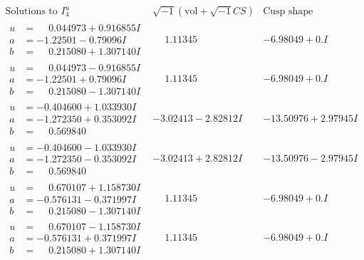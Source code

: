 \documentclass[1p]{elsarticle_modified}
\theoremstyle{definition}
\newcommand{\I}{\sqrt{-1}}
\begin{document}
$$\begin{array}{c|c|c}  
\text{Solutions to }I^u_{4}& \I (\text{vol} + \sqrt{-1}CS) & \text{Cusp shape}\\
 \hline 
\begin{aligned}
u &= \phantom{-}0.044973 + 0.916855 I \\
a &= -1.22501 - 0.79096 I \\
b &= \phantom{-}0.215080 + 1.307140 I\end{aligned}
 & \phantom{-}1.11345\phantom{ +0.000000I} & -6.98049 + 0. I\phantom{ +0.000000I} \\ \hline\begin{aligned}
u &= \phantom{-}0.044973 - 0.916855 I \\
a &= -1.22501 + 0.79096 I \\
b &= \phantom{-}0.215080 - 1.307140 I\end{aligned}
 & \phantom{-}1.11345\phantom{ +0.000000I} & -6.98049 + 0. I\phantom{ +0.000000I} \\ \hline\begin{aligned}
u &= -0.404600 + 1.033930 I \\
a &= -1.272350 + 0.353092 I \\
b &= \phantom{-}0.569840\phantom{ +0.000000I}\end{aligned}
 & -3.02413 - 2.82812 I & -13.50976 + 2.97945 I \\ \hline\begin{aligned}
u &= -0.404600 - 1.033930 I \\
a &= -1.272350 - 0.353092 I \\
b &= \phantom{-}0.569840\phantom{ +0.000000I}\end{aligned}
 & -3.02413 + 2.82812 I & -13.50976 - 2.97945 I \\ \hline\begin{aligned}
u &= \phantom{-}0.670107 + 1.158730 I \\
a &= -0.576131 - 0.371997 I \\
b &= \phantom{-}0.215080 - 1.307140 I\end{aligned}
 & \phantom{-}1.11345\phantom{ +0.000000I} & -6.98049 + 0. I\phantom{ +0.000000I} \\ \hline\begin{aligned}
u &= \phantom{-}0.670107 - 1.158730 I \\
a &= -0.576131 + 0.371997 I \\
b &= \phantom{-}0.215080 + 1.307140 I\end{aligned}
 & \phantom{-}1.11345\phantom{ +0.000000I} & -6.98049 + 0. I\phantom{ +0.000000I} \\ \hline\begin{aligned}

\end{aligned}
\end{array}$$
\end{document}
